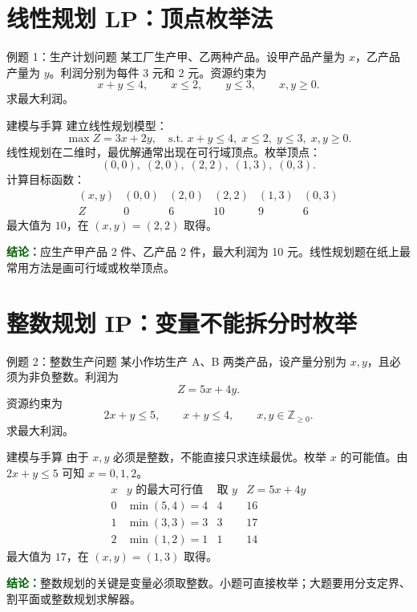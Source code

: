 \documentclass[UTF8,12pt,a4paper]{ctexart}
\newcommand{\conclusion}[1]{\par\smallskip\noindent\textcolor{darkgreen}{\textbf{结论：}}#1\par\smallskip}
\begin{document}
\newpage
\section{线性规划 LP：顶点枚举法}
\begin{examplebox}{例题 1：生产计划问题}
某工厂生产甲、乙两种产品。设甲产品产量为 $x$，乙产品产量为 $y$。利润分别为每件 3 元和 2 元。资源约束为
\[
x+y\le 4,
\qquad x\le 2,
\qquad y\le 3,
\qquad x,y\ge 0.
\]
求最大利润。
\end{examplebox}

\begin{solbox}{建模与手算}
建立线性规划模型：
\[
\max Z=3x+2y,
\quad
\text{s.t. } x+y\le 4,
\;x\le 2,
\;y\le 3,
\;x,y\ge 0.
\]
线性规划在二维时，最优解通常出现在可行域顶点。枚举顶点：
\[
(0,0),\;(2,0),\;(2,2),\;(1,3),\;(0,3).
\]
计算目标函数：
\[
\begin{array}{c|ccccc}
(x,y)&(0,0)&(2,0)&(2,2)&(1,3)&(0,3)\\
\hline
Z&0&6&10&9&6
\end{array}
\]
最大值为 $10$，在 $(x,y)=(2,2)$ 取得。
\end{solbox}
\conclusion{应生产甲产品 2 件、乙产品 2 件，最大利润为 10 元。线性规划题在纸上最常用方法是画可行域或枚举顶点。}

\section{整数规划 IP：变量不能拆分时枚举}
\begin{examplebox}{例题 2：整数生产问题}
某小作坊生产 A、B 两类产品，设产量分别为 $x,y$，且必须为非负整数。利润为
\[
Z=5x+4y.
\]
资源约束为
\[
2x+y\le 5,
\qquad x+y\le 4,
\qquad x,y\in\mathbb Z_{\ge 0}.
\]
求最大利润。
\end{examplebox}

\begin{solbox}{建模与手算}
由于 $x,y$ 必须是整数，不能直接只求连续最优。枚举 $x$ 的可能值。由 $2x+y\le 5$ 可知 $x=0,1,2$。
\[
\begin{array}{c|c|c|c}
x&y\text{ 的最大可行值}&\text{取 }y&Z=5x+4y\\
\hline
0&\min(5,4)=4&4&16\\
1&\min(3,3)=3&3&17\\
2&\min(1,2)=1&1&14
\end{array}
\]
最大值为 $17$，在 $(x,y)=(1,3)$ 取得。
\end{solbox}
\conclusion{整数规划的关键是变量必须取整数。小题可直接枚举；大题要用分支定界、割平面或整数规划求解器。}
\end{document}
